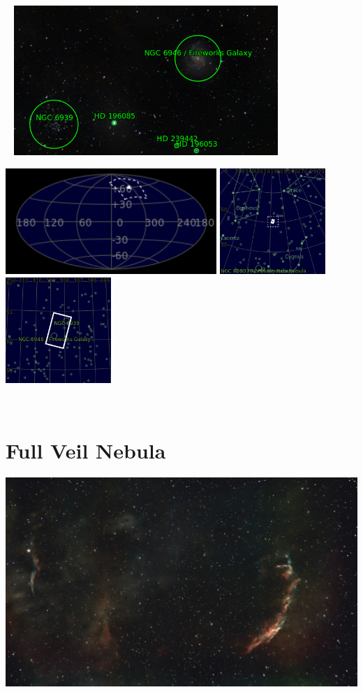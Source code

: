 \begin{center}
 \ \newpage
\includegraphics[width=0.75\textwidth]{../Imaging//Annotated/Fireworks_Galaxy_Annotated.jpg}

\includegraphics[height=4cm]{../Imaging//Annotated/Fireworks_Galaxy_Globe.jpg}
\includegraphics[height=4cm]{../Imaging//Annotated/Fireworks_Galaxy_Close.jpg}
\includegraphics[height=4cm]{../Imaging//Annotated/Fireworks_Galaxy_Closer.jpg}
\end{center}
\ \\\section{Full Veil Nebula}
\includegraphics[width=\textwidth]{../Imaging//Original/Full_Veil_Nebula.jpg}
